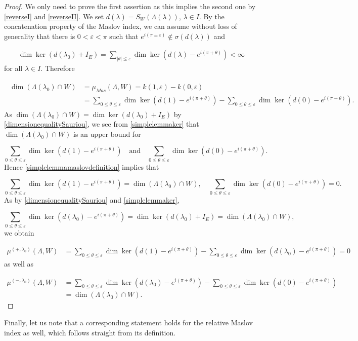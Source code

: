 \documentclass[a4paper,10pt]{article}
\begin{document}
\begin{proof}
We only need to prove the first assertion as this implies the second one by \eqref{reverseI} and \eqref{reverseII}. We set $d(\lambda)=S_W(\Lambda(\lambda))$, $\lambda\in I$. By the concatenation property of the Maslov index, we can assume without loss of generality that there is $0<\varepsilon<\pi$ such that $e^{i(\pi\pm\varepsilon)}\notin\sigma(d(\lambda))$ and

\begin{align}\label{simplelemmaker}
\dim\ker(d(\lambda_0)+I_E)=\sum_{|\theta|\leq\varepsilon}{\dim\ker(d(\lambda)-e^{i(\pi+\theta)})}<\infty
\end{align}
for all $\lambda\in I$. Therefore

\begin{align}\label{simplelemmamaslovdefinition}
\begin{split}
\dim(\Lambda(\lambda_0)\cap W)&=\mu_{Mas}(\Lambda,W)=k(1,\varepsilon)-k(0,\varepsilon)\\
&=\sum_{0\leq\theta\leq\varepsilon}\dim\ker(d(1)-e^{i(\pi+\theta)})-\sum_{0\leq\theta\leq\varepsilon}\dim\ker(d(0)-e^{i(\pi+\theta)}).
\end{split}
\end{align}
As $\dim(\Lambda(\lambda_0)\cap W)=\dim\ker(d(\lambda_0)+I_E)$ by \eqref{dimensionequalitySauriou}, we see from \eqref{simplelemmaker} that $\dim(\Lambda(\lambda_0)\cap W)$ is an upper bound for  

\[\sum_{0\leq\theta\leq\varepsilon}\dim\ker(d(1)-e^{i(\pi+\theta)})\quad\text{and}\quad \sum_{0\leq\theta\leq\varepsilon}\dim\ker(d(0)-e^{i(\pi+\theta)}).\]
Hence \eqref{simplelemmamaslovdefinition} implies that

\[\sum_{0\leq\theta\leq\varepsilon}\dim\ker(d(1)-e^{i(\pi+\theta)})=\dim(\Lambda(\lambda_0)\cap W),\quad \sum_{0\leq\theta\leq\varepsilon}\dim\ker(d(0)-e^{i(\pi+\theta)})=0.\]
As by \eqref{dimensionequalitySauriou} and \eqref{simplelemmaker},

\[\sum_{0\leq\theta\leq\varepsilon}\dim\ker(d(\lambda_0)-e^{i(\pi+\theta)})=\dim\ker(d(\lambda_0)+I_E)=\dim(\Lambda(\lambda_0)\cap W),\]
we obtain

\begin{align*}
\mu^{(+,\lambda_0)}(\Lambda,W)&=\sum_{0\leq\theta\leq\varepsilon}\dim\ker(d(1)-e^{i(\pi+\theta)})-\sum_{0\leq\theta\leq\varepsilon}\dim\ker(d(\lambda_0)-e^{i(\pi+\theta)})=0
\end{align*}
as well as

\begin{align*}
\mu^{(-,\lambda_0)}(\Lambda,W)&=\sum_{0\leq\theta\leq\varepsilon}\dim\ker(d(\lambda_0)-e^{i(\pi+\theta)})-\sum_{0\leq\theta\leq\varepsilon}\dim\ker(d(0)-e^{i(\pi+\theta)})\\
&=\dim(\Lambda(\lambda_0)\cap W).
\end{align*}
\end{proof}
\noindent
Finally, let us note that a corresponding statement holds for the relative Maslov index as well, which follows straight from its definition.
\end{document}
